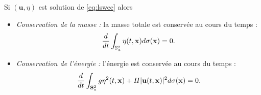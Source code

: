 \begin{proposition}
Si $(\mathbf{u}, \eta)$ est solution de \eqref{eq:lswec} alors
\begin{itemize}
\item \textit{Conservation de la masse : } la masse totale est conservée au cours du temps :
\begin{equation}
\dfrac{d}{dt} \displaystyle\int_{\mathbb{S}_a^2} \eta(t,\mathbf{x})d\sigma(\mathbf{x}) = 0.
\end{equation}

\item \textit{Conservation de l'énergie : }
l'énergie est conservée au cours du temps :
\begin{equation}
\dfrac{d}{dt} \displaystyle\int_{\mathbf{S}_a^2 }g  \eta^2(t,\mathbf{x}) + H | \mathbf{u}(t,\mathbf{x}) |^2 d \sigma (\mathbf{x}) = 0.
\end{equation}
\label{prop:lswe_cons}
\end{itemize}
\end{proposition}


